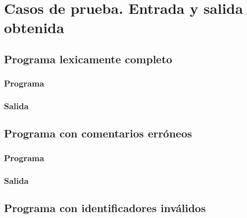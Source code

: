 
\chapter{Casos de prueba. Entrada y salida obtenida}
	
	
\section{Programa lexicamente completo}
	
    \subsection{Programa}
	    
        
	
   \subsection{Salida}
	    
        

    \hfill
    \clearpage

	

\section{Programa con comentarios erróneos}

    \subsection{Programa}
	    
        
	
   \subsection{Salida}
	    
        

    \hfill
    \clearpage



\section{Programa con identificadores inválidos}


